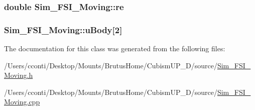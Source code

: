 \subsubsection[{re}]{\setlength{\rightskip}{0pt plus 5cm}double Sim\+\_\+\+F\+S\+I\+\_\+\+Moving\+::re\hspace{0.3cm}{\ttfamily [protected]}}\label{class_sim___f_s_i___moving_aa6ae4bc61dc72dc2c32f8eb7392f801b}
\hypertarget{class_sim___f_s_i___moving_a0375337ef732a1485729637ca0c34057}{}
\subsubsection[{u\+Body}]{ Sim\+\_\+\+F\+S\+I\+\_\+\+Moving\+::u\+Body\mbox{[}2\mbox{]}\hspace{0.3cm}{\ttfamily [protected]}}\label{class_sim___f_s_i___moving_a0375337ef732a1485729637ca0c34057}


The documentation for this class was generated from the following files\+:\begin{DoxyCompactItemize}
\item 
/\+Users/cconti/\+Desktop/\+Mounts/\+Brutus\+Home/\+Cubism\+U\+P\+\_\+D/source/\hyperlink{_sim___f_s_i___moving_8h}{Sim\+\_\+\+F\+S\+I\+\_\+\+Moving.\+h}\item 
/\+Users/cconti/\+Desktop/\+Mounts/\+Brutus\+Home/\+Cubism\+U\+P\+\_\+D/source/\hyperlink{_sim___f_s_i___moving_8cpp}{Sim\+\_\+\+F\+S\+I\+\_\+\+Moving.\+cpp}\end{DoxyCompactItemize}
